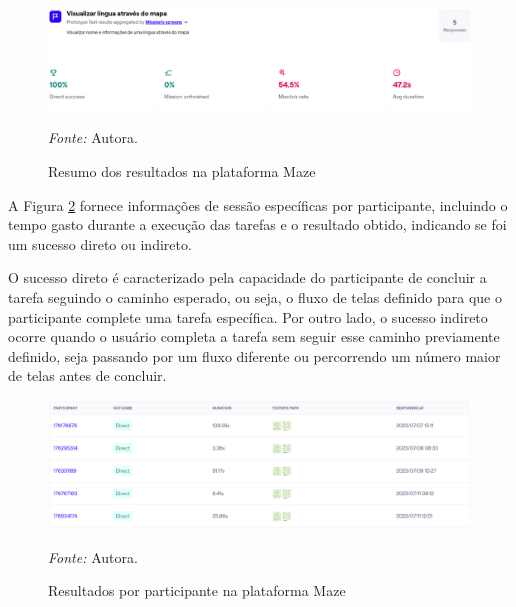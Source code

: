 \begin{figure}[h!]
	\centering
	\caption{Resumo dos resultados na plataforma Maze}
	\begin{adjustbox}{center}
		\includegraphics[width=1\textwidth]{figuras/maze.eps}
	\end{adjustbox}
	\begin{tablenotes}[flushleft]
		\centering
		\item \textit{Fonte:} Autora.
	\end{tablenotes}
	\label{fig31}
\end{figure}

A Figura \ref{fig32} fornece informações de sessão específicas por participante, incluindo o tempo gasto durante a execução das tarefas e o resultado obtido, indicando se foi um sucesso direto ou indireto.

O sucesso direto é caracterizado pela capacidade do participante de concluir a tarefa seguindo o caminho esperado, ou seja, o fluxo de telas definido para que o participante complete uma tarefa específica. Por outro lado, o sucesso indireto ocorre quando o usuário completa a tarefa 
sem seguir esse caminho previamente definido, seja passando por um fluxo diferente ou percorrendo um número maior de telas antes de concluir.

\begin{figure}[h!]
	\centering
	\caption{Resultados por participante na plataforma Maze}
	\begin{adjustbox}{center}
		\includegraphics[width=1\textwidth]{figuras/maze2.eps}
	\end{adjustbox}
	\begin{tablenotes}[flushleft]
		\centering
		\item \textit{Fonte:} Autora.
	\end{tablenotes}
	\label{fig32}
\end{figure}

